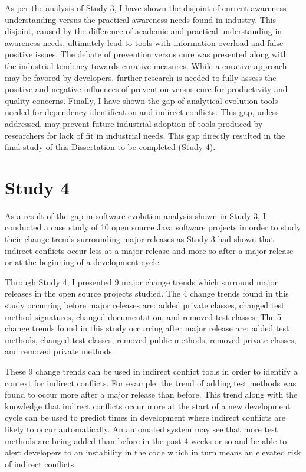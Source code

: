 As per the analysis of Study 3, I have shown the disjoint of current awareness understanding versus the practical
awareness needs found in industry. This disjoint, caused by the difference of academic and practical understanding in awareness needs,
ultimately lead to tools with information overload and false positive issues. The debate of prevention versus cure was presented along with
the industrial tendency towards curative measures. While a curative approach may be favored by developers, further research is needed
to fully assess the positive and negative influences of prevention versus cure for productivity and quality concerns. Finally, I have shown
the gap of analytical evolution tools needed for dependency identification and indirect conflicts. This gap, unless addressed, may prevent
future industrial adoption of tools produced by researchers for lack of fit in industrial needs. This gap directly resulted in the final
study of this Dissertation to be completed (Study 4).

\section{Study 4}

As a result of the gap in software evolution analysis shown in Study 3, I conducted a case study of 10 open source Java software 
projects in order to study their change trends surrounding
major releases as Study 3 had shown that indirect conflicts occur less at a major release and more so after a major release
or at the beginning of a development cycle. 

Through Study 4, I presented 9 major change trends which surround major releases in the open source
projects studied. The 4 change trends found in this study occurring before major releases are: added private classes, 
changed test method signatures, changed documentation, and removed test classes.
The 5 change trends found in this study occurring after major release are: added test methods, changed test classes, removed public methods, removed
private classes, and removed private methods.

These 9 change trends can be used in indirect conflict tools in order to identify a context for indirect conflicts.
For example, the trend of adding test methods was found to occur more after a major release than before. This trend along with
the knowledge that indirect conflicts occur more at the start of a new development cycle can be used to predict times in development
where indirect conflicts are likely to occur automatically. An automated system may see that more test methods are being added than
before in the past 4 weeks or so and be able to alert developers to an instability in the code which in turn means an elevated
risk of indirect conflicts.

